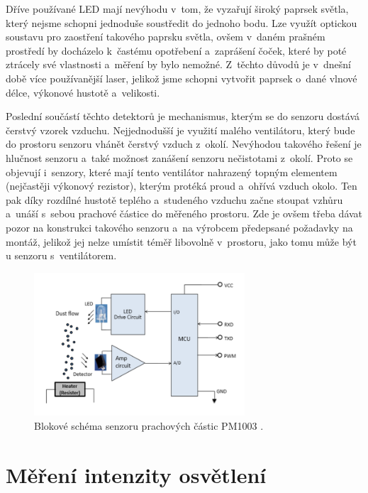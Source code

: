 Dříve používané LED mají nevýhodu v~tom, že vyzařují široký paprsek světla, který nejsme schopni jednoduše soustředit do jednoho bodu. Lze využít optickou soustavu pro zaostření takového paprsku světla, ovšem v~daném prašném prostředí by docházelo k~častému opotřebení a~zaprášení čoček, které by poté ztrácely své vlastnosti a~měření by bylo nemožné. Z~těchto důvodů je v~dnešní době více používanější laser, jelikož jsme schopni vytvořit paprsek o~dané vlnové délce, výkonové hustotě a~velikosti. 

Poslední součástí těchto detektorů je mechanismus, kterým se do senzoru dostává čerstvý vzorek vzduchu. Nejjednodušší je využití malého ventilátoru, který bude do prostoru senzoru vhánět čerstvý vzduch z~okolí. Nevýhodou takového řešení je hlučnost senzoru a~také možnost zanášení senzoru nečistotami z~okolí. Proto se objevují i~senzory, které mají tento ventilátor nahrazený topným elementem (nejčastěji výkonový rezistor), kterým protéká proud a~ohřívá vzduch okolo. Ten pak díky rozdílné hustotě teplého a~studeného vzduchu začne stoupat vzhůru a~unáší s~sebou prachové částice do měřeného prostoru. Zde je ovšem třeba dávat pozor na konstrukci takového senzoru a~na výrobcem předepsané požadavky na montáž, jelikož jej nelze umístit téměř libovolně v~prostoru, jako tomu může být u senzoru s~ventilátorem.

\begin{figure}
    \centering
    \includegraphics[width=0.70\textwidth]{obrazky/dustSensorPrinciple.png}
    \caption[Blokové schéma senzoru prachových částic PM1003.]{Blokové schéma senzoru prachových částic PM1003 \cite{PM1003Datasheet}.}
    \label{fig_dustSensorPrinciple}
\end{figure}

\section{Měření intenzity osvětlení}


